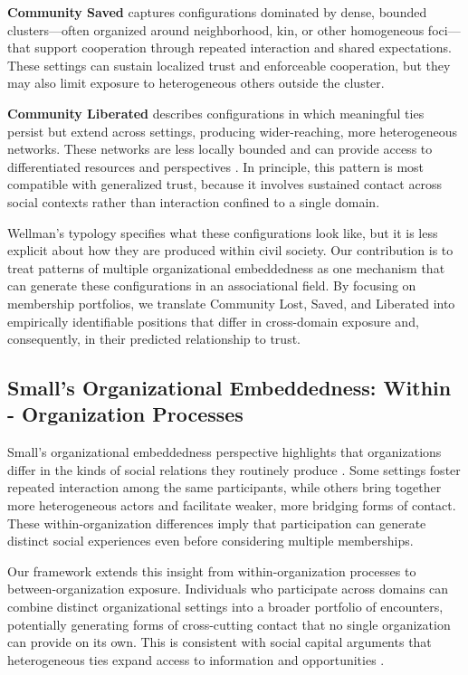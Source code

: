 \textbf{Community Saved} captures configurations dominated by dense, bounded clusters---often organized around neighborhood, kin, or other homogeneous foci---that support cooperation through repeated interaction and shared expectations. These settings can sustain localized trust and enforceable cooperation, but they may also limit exposure to heterogeneous others outside the cluster.

\textbf{Community Liberated} describes configurations in which meaningful ties persist but extend across settings, producing wider-reaching, more heterogeneous networks. These networks are less locally bounded and can provide access to differentiated resources and perspectives \parencite{fischer_dwell_1982}. In principle, this pattern is most compatible with generalized trust, because it involves sustained contact across social contexts rather than interaction confined to a single domain.

Wellman's typology specifies what these configurations look like, but it is less explicit about how they are produced within civil society. Our contribution is to treat patterns of multiple organizational embeddedness as one mechanism that can generate these configurations in an associational field. By focusing on membership portfolios, we translate Community Lost, Saved, and Liberated into empirically identifiable positions that differ in cross-domain exposure and, consequently, in their predicted relationship to trust.

\subsection{Small's Organizational Embeddedness: Within - Organization Processes}

Small's organizational embeddedness perspective highlights that organizations differ in the kinds of social relations they routinely produce \parencite{small_unanticipated_2009}. Some settings foster repeated interaction among the same participants, while others bring together more heterogeneous actors and facilitate weaker, more bridging forms of contact. These within-organization differences imply that participation can generate distinct social experiences even before considering multiple memberships.

Our framework extends this insight from within-organization processes to between-organization exposure. Individuals who participate across domains can combine distinct organizational settings into a broader portfolio of encounters, potentially generating forms of cross-cutting contact that no single organization can provide on its own. This is consistent with social capital arguments that heterogeneous ties expand access to information and opportunities \parencite{lin_social_2002}.

